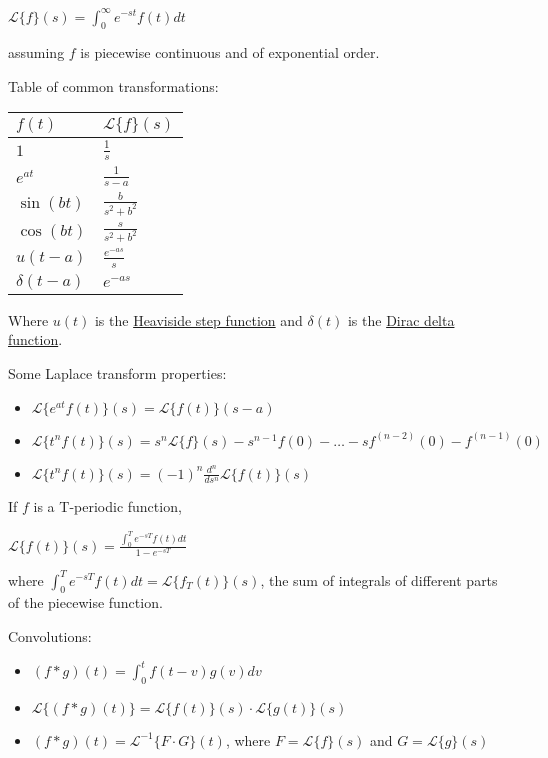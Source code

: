 \documentclass[12pt]{article}
\begin{document}
\(\mathcal{L}\{f\}(s) = \int_0^{\infty} e^{-st} f(t) dt\)

assuming \(f\) is piecewise continuous and of exponential order.

Table of common transformations:

\begin{center}
\begin{tabular}{ll}
\(f(t)\) & \(\mathcal{L}\{f\}(s)\)\\
\hline
\(1\) & \(\frac{1}{s}\)\\
\(e^{at}\) & \(\frac{1}{s-a}\)\\
\(\sin(bt)\) & \(\frac{b}{s^2+b^2}\)\\
\(\cos(bt)\) & \(\frac{s}{s^2+b^2}\)\\
\(u(t-a)\) & \(\frac{e^{-as}}{s}\)\\
\(\delta(t-a)\) & \(e^{-as}\)\\
\end{tabular}
\end{center}

Where \(u(t)\) is the \href{https://en.wikipedia.org/wiki/Heaviside\_step\_function}{Heaviside step function} and \(\delta(t)\) is the \href{https://en.wikipedia.org/wiki/Dirac\_delta\_function}{Dirac
delta function}.

Some Laplace transform properties:

\begin{itemize}
\item \(\mathcal{L}\{e^{at}f(t)\}(s) = \mathcal{L}\{f(t)\}(s-a)\)
\item \(\mathcal{L}\{t^nf(t)\}(s) = s^n\mathcal{L}\{f\}(s)-s^{n-1}f(0)-\ldots-sf^{(n-2)}(0)-f^{(n-1)}(0)\)
\item \(\mathcal{L}\{t^nf(t)\}(s) = (-1)^n \frac{d^n}{ds^n} \mathcal{L}\{f(t)\}(s)\)
\end{itemize}

If \(f\) is a T-periodic function, 

\(\mathcal{L}\{f(t)\}(s) = \frac{\int_0^T e^{-sT} f(t) dt}{1-e^{-sT}}\)

where \(\int_0^T e^{-sT} f(t) dt = \mathcal{L}\{f_T(t)\}(s)\), the sum of
integrals of different parts of the piecewise function.

Convolutions:

\begin{itemize}
\item \((f*g)(t) = \int_0^t f(t-v)g(v)dv\)
\item \(\mathcal{L}\{(f*g)(t)\} = \mathcal{L}\{f(t)\}(s)\cdot \mathcal{L}\{g(t)\}(s)\)
\item \((f*g)(t) = \mathcal{L}^{-1}\{F\cdot G\}(t)\), where
\(F=\mathcal{L}\{f\}(s)\) and \(G=\mathcal{L}\{g\}(s)\)
\end{itemize}
\end{document}
